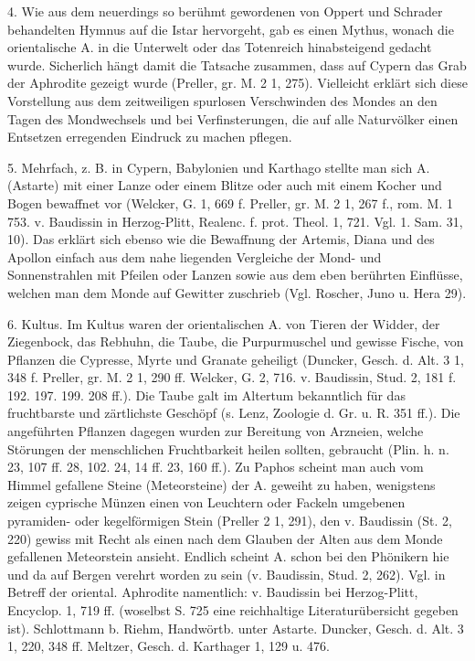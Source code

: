 \documentclass[a4paper, 11pt, oneside]{article}
\begin{document}
4. Wie aus dem neuerdings so berühmt gewordenen von Oppert und Schrader behandelten Hymnus auf die Istar hervorgeht, gab es einen Mythus, wonach die orientalische A. in die Unterwelt oder das Totenreich hinabsteigend gedacht wurde. Sicherlich hängt damit die Tatsache zusammen, dass auf Cypern das Grab der Aphrodite gezeigt wurde (Preller, gr. M. 2 1, 275). Vielleicht erklärt sich diese Vorstellung aus dem zeitweiligen spurlosen Verschwinden des Mondes an den Tagen des Mondwechsels und bei Verfinsterungen, die auf alle Naturvölker einen Entsetzen erregenden Eindruck zu machen pflegen.

5. Mehrfach, z. B. in Cypern, Babylonien und Karthago stellte man sich A. (Astarte) mit einer Lanze oder einem Blitze oder auch mit einem Kocher und Bogen bewaffnet vor (Welcker, G. 1, 669 f. Preller, gr. M. 2 1, 267 f., rom. M. 1 753. v. Baudissin in Herzog-Plitt, Realenc. f. prot. Theol. 1, 721. Vgl. 1. Sam. 31, 10). Das erklärt sich ebenso wie die Bewaffnung der Artemis, Diana und des Apollon einfach aus dem nahe liegenden Vergleiche der Mond- und Sonnenstrahlen mit Pfeilen oder Lanzen sowie aus dem eben berührten Einflüsse, welchen man dem Monde auf Gewitter zuschrieb (Vgl. Roscher, Juno u. Hera 29).

6. Kultus. Im Kultus waren der orientalischen A. von Tieren der Widder, der Ziegenbock, das Rebhuhn, die Taube, die Purpurmuschel und gewisse Fische, von Pflanzen die Cypresse, Myrte und Granate geheiligt (Duncker, Gesch. d. Alt. 3 1, 348 f. Preller, gr. M. 2 1, 290 ff. Welcker, G. 2, 716. v. Baudissin, Stud. 2, 181 f. 192. 197. 199. 208 ff.). Die Taube galt im Altertum bekanntlich für das fruchtbarste und zärtlichste Geschöpf (s. Lenz, Zoologie d. Gr. u. R. 351 ff.). Die angeführten Pflanzen dagegen wurden zur Bereitung von Arzneien, welche Störungen der menschlichen Fruchtbarkeit heilen sollten, gebraucht (Plin. h. n. 23, 107 ff. 28, 102. 24, 14 ff. 23, 160 ff.). Zu Paphos scheint man auch vom Himmel gefallene Steine (Meteorsteine) der A. geweiht zu haben, wenigstens zeigen cyprische Münzen einen von Leuchtern oder Fackeln umgebenen pyramiden- oder kegelförmigen Stein (Preller 2 1, 291), den v. Baudissin (St. 2, 220) gewiss mit Recht als einen nach dem Glauben der Alten aus dem Monde gefallenen Meteorstein ansieht. Endlich scheint A. schon bei den Phönikern hie und da auf Bergen verehrt worden zu sein (v. Baudissin, Stud. 2, 262). Vgl. in Betreff der oriental. Aphrodite namentlich: v. Baudissin bei Herzog-Plitt, Encyclop. 1, 719 ff. (woselbst S. 725 eine reichhaltige Literaturübersicht gegeben ist). Schlottmann b. Riehm, Handwörtb. unter Astarte. Duncker, Gesch. d. Alt. 3 1, 220, 348 ff. Meltzer, Gesch. d. Karthager 1, 129 u. 476.
\end{document}
